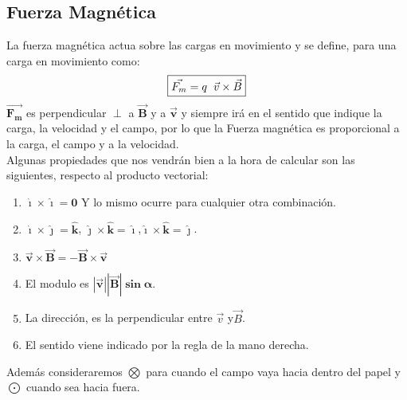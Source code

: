 \subsection{Fuerza Magnética}
\newline
 La fuerza magnética actua sobre las cargas en movimiento y se define, para una carga en movimiento como:
\[
        \boxed{\vec{F_m} = q\hspace{2mm} \vec{v} \times \vec{B}}
\]
 \(\bm{\vec{F_m}}\) es perpendicular \(\bm{\perp}\) a \(\bm{\vec{B}}\) y a \(\bm{\vec{v}}\) y siempre irá en el sentido que indique la carga, la velocidad y el campo, por lo que la Fuerza magnética es proporcional a la carga, el campo y a la velocidad.
\\
Algunas propiedades que nos vendrán bien a la hora de calcular son las siguientes, respecto al producto vectorial:
\begin{enumerate}
        \item \(\bm{\hat{\imath} \times \hat{\imath} = 0}\) Y lo mismo ocurre para cualquier otra combinación.
        \item \(\bm{\hat{\imath}\times \hat{\jmath} = \hat{k}}\), \(\bm{\hat{\jmath}\times\hat{k}=\hat{\imath}}\),\(\bm{\hat{\imath}\times\hat{k}=\hat{\jmath}}\).
        \item \(\bm{\vec{v} \times \vec{B} = - \vec{B} \times \vec{v}}\)
        \item El modulo es \(\bm{\left | \vec{v} \right |\left | \vec{B} \right |\sin{\alpha}}\).
        \item La dirección, es la perpendicular entre \(\vec{v}\) y\(\vec{B}\).
        \item El sentido viene indicado por la regla de la mano derecha.
\end{enumerate}
 Además consideraremos \(\bm{\bigotimes}\) para cuando el campo vaya hacia dentro del papel y \(\bm{\bigodot}\) cuando sea hacia fuera.
